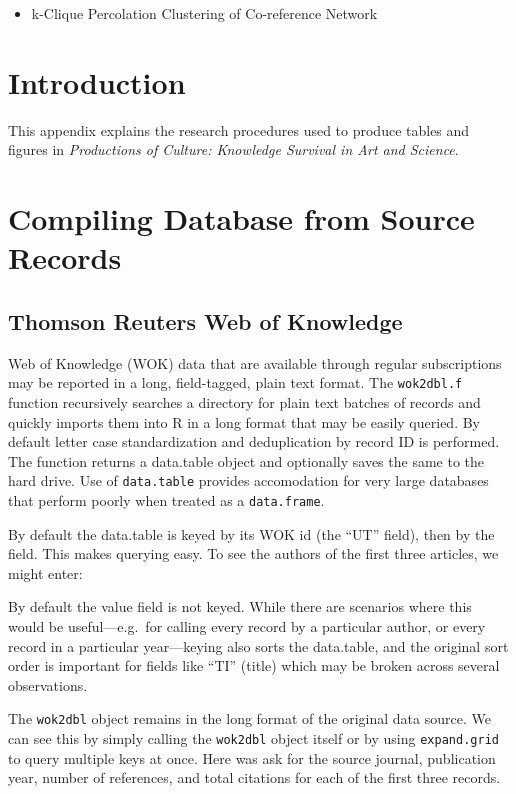\begin{itemize}
\tightlist
\item
  k-Clique Percolation Clustering of Co-reference Network
\end{itemize}

\section{Introduction}\label{introduction}

This appendix explains the research procedures used to produce tables
and figures in \emph{Productions of Culture: Knowledge Survival in Art
and Science}.

\section{Compiling Database from Source
Records}\label{compiling-database-from-source-records}

\subsection{Thomson Reuters Web of
Knowledge}\label{thomson-reuters-web-of-knowledge}

Web of Knowledge (WOK) data that are available through regular
subscriptions may be reported in a long, field-tagged, plain text
format. The \texttt{wok2dbl.f} function recursively searches a directory
for plain text batches of records and quickly imports them into R in a
long format that may be easily queried. By default letter case
standardization and deduplication by record ID is performed. The
function returns a data.table object and optionally saves the same to
the hard drive. Use of \texttt{data.table} provides accomodation for
very large databases that perform poorly when treated as a
\texttt{data.frame}.

By default the data.table is keyed by its WOK id (the ``UT'' field),
then by the field. This makes querying easy. To see the authors of the
first three articles, we might enter:

By default the value field is not keyed. While there are scenarios where
this would be useful---e.g.~for calling every record by a particular
author, or every record in a particular year---keying also sorts the
data.table, and the original sort order is important for fields like
``TI'' (title) which may be broken across several observations.

The \texttt{wok2dbl} object remains in the long format of the original
data source. We can see this by simply calling the \texttt{wok2dbl}
object itself or by using \texttt{expand.grid} to query multiple keys at
once. Here was ask for the source journal, publication year, number of
references, and total citations for each of the first three records.

